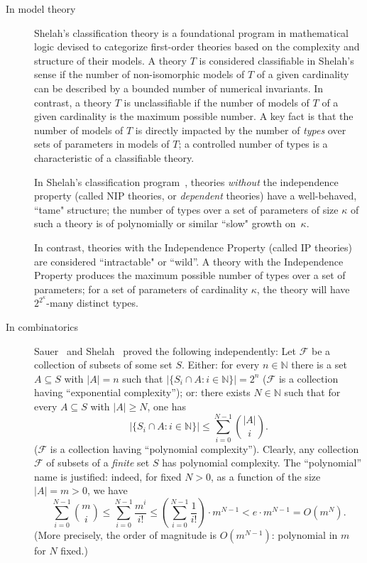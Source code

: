 \begin{description}

\item[In model theory]
Shelah's classification theory is a foundational program in mathematical logic devised to categorize first-order theories based on the complexity and structure of their models.
A theory $T$ is considered classifiable in Shelah's sense if the number of non-isomorphic models of $T$ of a given cardinality can be described by a bounded number of numerical invariants.
In contrast, a theory $T$ is unclassifiable if the number of models of $T$ of a given cardinality is the maximum possible number.
A key fact is that the number of models of $T$ is directly impacted by the number of \emph{types} over sets of parameters in models of $T$; a controlled number of types is a characteristic of a classifiable theory.


In Shelah's classification program~\cite{Shelah:1990}, theories \emph{without} the independence property (called NIP theories, or \emph{dependent} theories) have a well-behaved, ``tame" structure;
the number of types over a set of parameters of size $\kappa$ of such a theory is of polynomially or similar “slow" growth on~$\kappa$.

In contrast, theories with the Independence Property (called IP theories) are considered “intractable" or “wild”.
A theory with the Independence Property produces the maximum possible number of types over a set of parameters; for a set of parameters of cardinality $\kappa$, the theory will have $2^{2^{\kappa}}$-many distinct types.

\item[In combinatorics]
Sauer~\cite{Sauer:1972} and Shelah~\cite{Shelah:1972} proved the following independently:
Let $\mathscr{F}$ be a collection of subsets of some set $S$.
Either:
for every $n\in\mathbb{N}$ there is a set $A\subseteq S$ with $|A|=n$ such that $|\{S_i\cap A: i\in\mathbb{N}\}|=2^n$ ($\mathscr{F}$ is a collection having ``exponential complexity'');
or: there exists $N\in\mathbb{N}$ such that for every $A\subseteq S$ with $|A|\ge N$, one has
\[
|\{S_i\cap A: i\in\mathbb{N}\}| \le \sum_{i=0}^{N-1} \binom{|A|}{i}.
\]
($\mathscr{F}$ is a collection having ``polynomial complexity'').
Clearly, any collection $\mathscr{F}$ of subsets of a \emph{finite} set $S$ has polynomial complexity.
The ``polynomial'' name is justified:
indeed, for fixed $N>0$, as a function of the size $|A| = m > 0$, we have
\begin{equation*}
    \sum_{i=0}^{N-1} \binom{m}{i}
    \le \sum_{i=0}^{N-1}\frac{m^{i}}{i!}
    \le \left( \sum_{i=0}^{N-1}\frac{1}{i!} \right)\cdot m^{N-1}
    < e\cdot m^{N-1} = O \left( m^N \right).
\end{equation*}
(More precisely, the order of magnitude is $O(m^{N-1})$:
polynomial in $m$ for $N$ fixed.)


\end{description}
